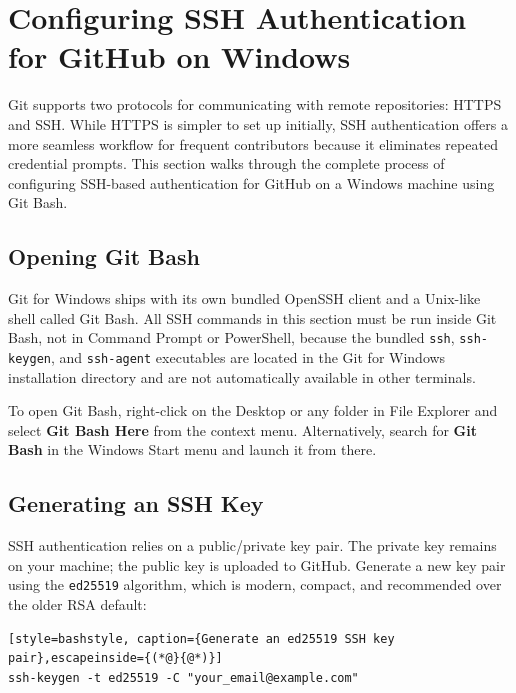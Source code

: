 \section{Configuring SSH Authentication for GitHub on Windows}
\label{sec:ssh-windows}

Git supports two protocols for communicating with remote repositories: HTTPS and SSH. While HTTPS is simpler to set up initially, SSH authentication offers a more seamless workflow for frequent contributors because it eliminates repeated credential prompts. This section walks through the complete process of configuring SSH-based authentication for GitHub on a Windows machine using Git Bash.

\subsection{Opening Git Bash}

Git for Windows ships with its own bundled OpenSSH client and a Unix-like shell called Git Bash. All SSH commands in this section must be run inside Git Bash, not in Command Prompt or PowerShell, because the bundled \texttt{ssh}, \texttt{ssh-keygen}, and \texttt{ssh-agent} executables are located in the Git for Windows installation directory and are not automatically available in other terminals.

To open Git Bash, right-click on the Desktop or any folder in File Explorer and select \textbf{Git Bash Here} from the context menu. Alternatively, search for \textbf{Git Bash} in the Windows Start menu and launch it from there.

\subsection{Generating an SSH Key}

SSH authentication relies on a public/private key pair. The private key remains on your machine; the public key is uploaded to GitHub. Generate a new key pair using the \texttt{ed25519} algorithm, which is modern, compact, and recommended over the older RSA default:

\begin{lstlisting}[style=bashstyle, caption={Generate an ed25519 SSH key pair},escapeinside={(*@}{@*)}]
ssh-keygen -t ed25519 -C "your_email@example.com"
\end{lstlisting}

